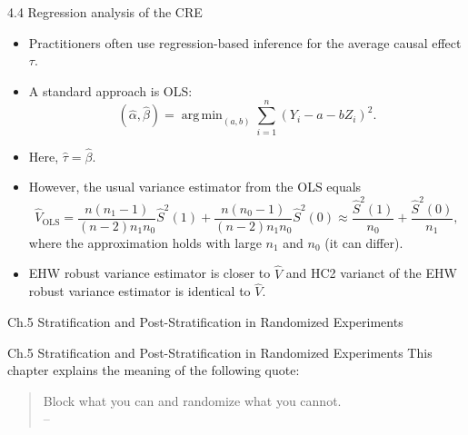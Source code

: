 \documentclass[aspectratio=169, 12pt]{beamer}
\DeclareMathOperator*{\argmin}{arg\,min}
\begin{document}
\begin{frame}{4.4 Regression analysis of the CRE}
  \begin{itemize}
    \item Practitioners often use regression-based inference for the average causal effect $\tau$.
    \item A standard approach is OLS: $$(\widehat{\alpha}, \widehat{\beta}) = \argmin_{(a,b)}\sum_{i=1}^{n}(Y_i-a-bZ_i)^2.$$
    \item Here, $\widehat{\tau} = \widehat{\beta}$.
    \item However, the usual variance estimator from the OLS equals
    \[
    \widehat{V}_\text{OLS} = \frac{n(n_1-1)}{(n-2)n_1n_0}\widehat{S}^2(1) + \frac{n(n_0-1)}{(n-2)n_1n_0}\widehat{S}^2(0) \approx \frac{\widehat{S}^2(1)}{n_0} + \frac{\widehat{S}^2(0)}{n_1},
    \]
    where the approximation holds with large $n_1$ and $n_0$ (it can differ).
    \item EHW robust variance estimator is closer to $\widehat{V}$ and HC2 varianct of the EHW robust variance estimator is identical to $\widehat{V}$.
  \end{itemize}
\end{frame}

\begin{frame}

  {
    \large
    Ch.5 Stratification and Post-Stratification in Randomized Experiments
  }
  
\end{frame}

\begin{frame}{Ch.5 Stratification and Post-Stratification in Randomized Experiments}
  This chapter explains the meaning of the following quote:
  \begin{quotation}
    Block what you can and randomize what you cannot. \\
    -- \ \citet{box1978statistics}
  \end{quotation}
\end{frame}
\end{document}
